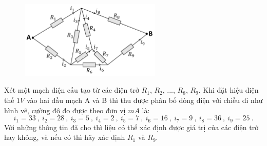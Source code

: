 \begin{figure}[ht]
\centering
\includegraphics[width=0.6\textwidth,keepaspectratio]{Problem_2/Figs/P2A.png}
\end{figure}

Xét một mạch điện cấu tạo từ các điện trở $R_1$, $R_2$, ..., $R_8$, $R_9$. Khi đặt hiệu điện thế $1V$ vào hai đầu mạch A và B thì thu được phân bố dòng điện với chiều đi như hình vẽ, cường độ đo được theo đơn vị $mA$ là:
\begin{equation}
i_1 = 33 \ , \ i_2 = 28 \ , \ i_3 = 5 \ , \ i_4 = 2 \ , \ i_5 = 7 \ , \ i_6 = 16 \ , \ i_7 = 9 \ , \ i_8 = 36 \ , \ i_9 = 25 \ . \nonumber
\end{equation}
Với những thông tin đã cho thì liệu có thể xác định được giá trị của các điện trở hay không, và nếu có thì hãy xác định $R_1$ và $R_9$.